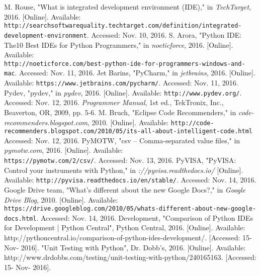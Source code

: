 \documentclass [10pt]{article}
\begin{document}
\begin{thebibliography}{9}
M. Rouse, "What is integrated development environment (IDE)," in \textit{TechTarget}, 2016. [Online].
 Available: \\\texttt{http://searchsoftwarequality.techtarget.com/definition/integrated-development-environment}. Accessed: Nov. 10, 2016.
S. Arora, "Python IDE: The10 Best IDEs for Python Programmers," in \textit{noeticforce}, 2016. [Online]. 
Available: \\\texttt{http://noeticforce.com/best-python-ide-for-programmers-windows-and-mac}. Accessed: Nov. 11, 2016.
Jet Barins, "PyCharm," in \textit{jetbrains}, 2016. [Online]. Available: \texttt{https://www.jetbrains.com/pycharm/}. Accessed: Nov. 11, 2016.
Pydev, "pydev," in \textit{pydev}, 2016. [Online]. Available: \texttt{http://www.pydev.org/}. Accessed: Nov. 12, 2016.
\textit{Programmer Manual}, 1st ed., TekTronix, Inc., Beaverton, OR, 2009, pp. 5-6.
M. Bruch, "Eclipse Code Recommenders," in \textit{code-recommenders.blogspot.com}, 2010. [Online]. Available: \texttt{http://code-recommenders.blogspot.com/2010/05/its-all-about-intelligent-code.html} Accessed: Nov. 12, 2016.
PyMOTW, "csv – Comma-separated value files," in \textit{pymotw.com}, 2016. [Online]. Available: \\\texttt{https://pymotw.com/2/csv/}. Accessed: Nov. 13, 2016.
PyVISA, "PyVISA: Control your instruments with Python," in \textit{://pyvisa.readthedocs.io/} [Online]. Available: \texttt{http://pyvisa.readthedocs.io/en/stable/}. Accessed: Nov. 14, 2016.
Google Drive team, "What’s different about the new Google Docs?," in \textit{Google Drive Blog}, 2010. [Online]. Available: \texttt{https://drive.googleblog.com/2010/05/whats-different-about-new-google-docs.html}. Accessed: Nov. 14, 2016.
Development, "Comparison of Python IDEs for Development | Python Central", Python Central, 2016. [Online]. Available: http://pythoncentral.io/comparison-of-python-ides-development/. [Accessed: 15- Nov- 2016].
"Unit Testing with Python", Dr. Dobb's, 2016. [Online]. Available: http://www.drdobbs.com/testing/unit-testing-with-python/240165163. [Accessed: 15- Nov- 2016].

\end{thebibliography}
\end{document}
